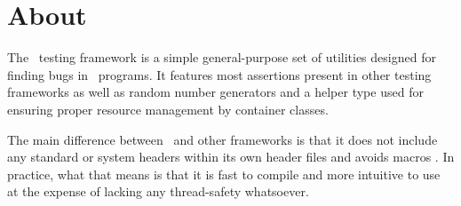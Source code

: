 \section{About}

The \voidtest\ testing framework is a simple general-purpose set of utilities designed for finding
bugs in \cpp\ programs. It features most assertions present in other testing frameworks as well as
random number generators and a helper type used for ensuring proper resource management by
container classes. \par
The main difference between \voidtest\ and other frameworks is that it does not include any standard
or system headers within its own header files and avoids macros . In practice,
what that means is that it is  fast to compile and more intuitive to use at the
expense of lacking any thread-safety whatsoever.

